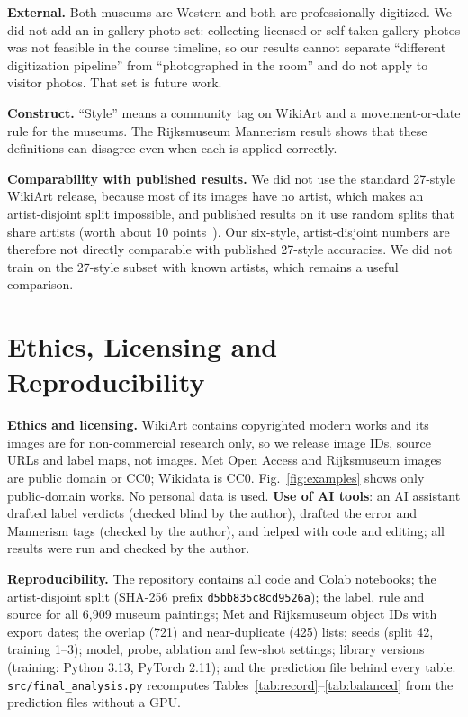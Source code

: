 \documentclass[conference]{IEEEtran}
\begin{document}
\textbf{External.} Both museums are Western and both are professionally digitized. We did not add an in-gallery photo set: collecting licensed or self-taken gallery photos was not feasible in the course timeline, so our results cannot separate ``different digitization pipeline'' from ``photographed in the room'' and do not apply to visitor photos. That set is future work.

\textbf{Construct.} ``Style'' means a community tag on WikiArt and a movement-or-date rule for the museums. The Rijksmuseum Mannerism result shows that these definitions can disagree even when each is applied correctly.

\textbf{Comparability with published results.} We did not use the standard 27-style WikiArt release, because most of its images have no artist, which makes an artist-disjoint split impossible, and published results on it use random splits that share artists (worth about 10 points~\cite{ashton2026}). Our six-style, artist-disjoint numbers are therefore not directly comparable with published 27-style accuracies. We did not train on the 27-style subset with known artists, which remains a useful comparison.

\section{Ethics, Licensing and Reproducibility}

\textbf{Ethics and licensing.} WikiArt contains copyrighted modern works and its images are for non-commercial research only, so we release image IDs, source URLs and label maps, not images. Met Open Access and Rijksmuseum images are public domain or CC0; Wikidata is CC0. Fig.~\ref{fig:examples} shows only public-domain works. No personal data is used. \textbf{Use of AI tools}: an AI assistant drafted label verdicts (checked blind by the author), drafted the error and Mannerism tags (checked by the author), and helped with code and editing; all results were run and checked by the author.

\textbf{Reproducibility.} The repository contains all code and Colab notebooks; the artist-disjoint split (SHA-256 prefix \texttt{d5bb835c8cd9526a}); the label, rule and source for all 6,909 museum paintings; Met and Rijksmuseum object IDs with export dates; the overlap (721) and near-duplicate (425) lists; seeds (split 42, training 1--3); model, probe, ablation and few-shot settings; library versions (training: Python 3.13, PyTorch 2.11); and the prediction file behind every table. \texttt{src/final\_analysis.py} recomputes Tables~\ref{tab:record}--\ref{tab:balanced} from the prediction files without a GPU.
\end{document}
